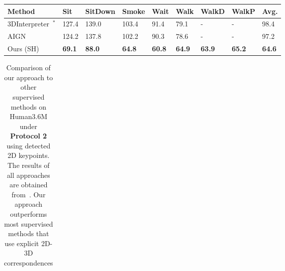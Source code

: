 \documentclass[runningheads]{llncs}
\makeatletter
\DeclareRobustCommand\onedot{\futurelet\@let@token\@onedot}
\def\@onedot{\ifx\@let@token.\else.\null\fi\xspace}
\def\etal{\emph{et al}\onedot}
\makeatother
\begin{document}
\begin{table*}[t]
\begin{tabularx}{\textwidth}{ l *{8}{Y} }
		\bottomrule
		\toprule	
		Method & Sit & SitDown & Smoke & Wait & Walk & WalkD & WalkP & Avg.\\
		\midrule
		3DInterpreter~\cite{InterpreterNetwork2016}$^{\ast}$&127.4 & 139.0 & 103.4 & 91.4 &  79.1 & - & - &  98.4 \\
		AIGN~\cite{Tung_2017_ICCV} & 124.2 & { 137.8} & 102.2 & 90.3 & 78.6  &  - & - &  97.2\\
		Ours (SH) & {\bf 69.1}&	\textbf{88.0}& \textbf{64.8} &	{\bf 60.8} & 	\textbf{64.9} &	\textbf{63.9}	& \textbf{65.2} &	{\bf 64.6}\\
		\bottomrule
	\end{tabularx}
\end{table*}\begin{table}[t]
\caption{Comparison of our approach to other supervised methods on Human3.6M under \textbf{Protocol 2} using detected 2D keypoints. The results of all approaches are obtained from~\cite{MartinezICCV2017}. Our approach outperforms most supervised methods that use explicit 2D-3D correspondences}
\label{table:P2_sh_supervisedcomparison}
	\centering
	\begin{tabularx}{\textwidth}{ l *{8}{Y} }
		

\end{tabularx}
\end{table}
\end{document}
